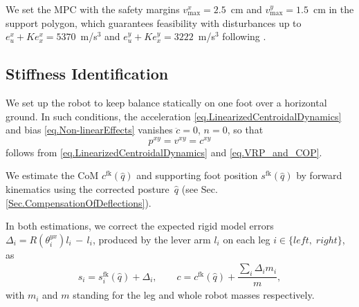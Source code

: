 \documentclass[letterpaper, 10 pt, conference]{ieeeconf}  %
\begin{document}
We set the MPC with the safety margins $v_\mathrm{max}^x = 2.5$~cm and $v_\mathrm{max}^y = 1.5$~cm in the support polygon, which guarantees feasibility with disturbances up to $e_u^x + Ke_x^x = 5370$~m/s$^3$ and $e_u^y + Ke_x^y = 3222$~m/s$^3$ following \cite[Chapter 4]{Villa2019managing}.





\subsection{Stiffness Identification}\label{Sec.stiffnessIdentification}

We set up the robot to keep balance statically on one foot over a horizontal ground. In such conditions, the acceleration \eqref{eq.LinearizedCentroidalDynamics} and bias \eqref{eq.Non-linearEffects} vanishes $\ddot{c} = 0$, $n = 0$, so that 
%
\begin{equation}\label{eq.EquilibriumCondition}
    p^{xy}=v^{xy}=c^{xy}
\end{equation}
%
follows from \eqref{eq.LinearizedCentroidalDynamics} and \eqref{eq.VRP_and_COP}.

We estimate the CoM $c^\mathrm{fk}(\hat{q})$ and supporting foot position $s^\mathrm{fk}(\hat{q})$ by forward kinematics \cite{Cotton2009estimation} using the corrected posture~$\hat{q}$ (see Sec. \ref{Sec.CompensationOfDeflections}).

In both estimations, we correct the expected rigid model errors $\Delta_i = R(\theta_i^{y x})l_i\,-\,l_i$, produced by the lever arm $l_i$ on each leg $i\in\{ \mathit{left},\;\mathit{right}\}$, as
%
\begin{align}
    s_i = s_i^\mathrm{fk}(\hat{q}) + \Delta_i,\qquad c = c^\mathrm{fk}(\hat{q}) + \dfrac{\sum_i \Delta_i m_i}{m},
\end{align}
%
with $m_i$ and $m$ standing for the leg and whole robot masses respectively.
%
%
\end{document}
